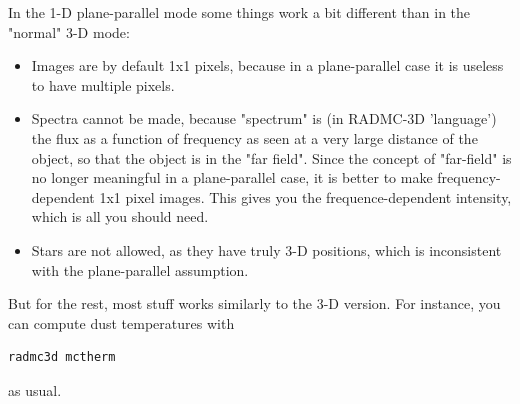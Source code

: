 \documentclass{report}
\newenvironment{asciibox}%
  {\begin{list}{}{%
    \setlength{\topsep}{0.5em}%
    \setlength{\parskip}{0em}%
    \setlength{\parsep}{0em}%
    \setlength{\itemsep}{0em}%
    \setlength{\rightmargin}{0em}%
    \setlength{\leftmargin}{3.0em}%
    \setlength{\labelsep}{1em}%
    \setlength{\labelwidth}{2em}%
  }\normalfont\footnotesize\item}
  {\end{list}}
\begin{document}
In the 1-D plane-parallel mode some things work a bit different than in the
"normal" 3-D mode:
\begin{itemize}
\item Images are by default 1x1 pixels, because in a plane-parallel case it
  is useless to have multiple pixels.
\item Spectra cannot be made, because "spectrum" is (in RADMC-3D 'language')
  the flux as a function of frequency as seen at a very large distance of
  the object, so that the object is in the "far field". Since the concept of
  "far-field" is no longer meaningful in a plane-parallel case, it is better
  to make frequency-dependent 1x1 pixel images. This gives you the
  frequence-dependent intensity, which is all you should need.
\item Stars are not allowed, as they have truly 3-D positions, which is
  inconsistent with the plane-parallel assumption.
\end{itemize}

But for the rest, most stuff works similarly to the 3-D version. For instance,
you can compute dust temperatures with 
\begin{asciibox}\begin{verbatim}
radmc3d mctherm
\end{verbatim}\end{asciibox}
as usual.
\end{document}
